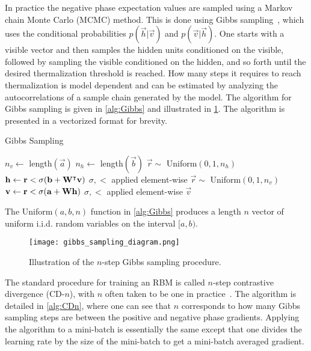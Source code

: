 In practice the negative phase expectation values are sampled using a Markov chain Monte Carlo (MCMC) method.
This is done using Gibbs sampling~\cite{hinton_rbm_training}, which uses the conditional probabilities \( p(\vec{h}|\vec{v}) \) and \( p(\vec{v}|\vec{h}) \).
One starts with a visible vector and then samples the hidden units conditioned on the visible, followed by sampling the visible conditioned on the hidden, and so forth until the desired thermalization threshold is reached.
How many steps it requires to reach thermalization is model dependent and can be estimated by analyzing the autocorrelations of a sample chain generated by the model.
The algorithm for Gibbs sampling is given in \cref{alg:Gibbs} and illustrated in \cref{fig:gibbs_sampling_diagram}.
The algorithm is presented in a vectorized format for brevity.

\begin{algorithm}
\caption{Gibbs Sampling}
\begin{algorithmic}[1]
        \State $n_v \gets$ length$(\vec{a})$
        \State $n_h \gets$ length$(\vec{b})$
            \State $\vec{r} \sim$ Uniform$(0, 1, n_h)$
            \State $\mathbf{h} \gets \mathbf{r} < \sigma(\mathbf{b} + \mathbf{W}^\intercal\mathbf{v})$
                \Comment $\sigma, <$ applied element-wise
            \State $\vec{r} \sim$ Uniform$(0, 1, n_v)$
            \State $\mathbf{v} \gets \mathbf{r} < \sigma(\mathbf{a} + \mathbf{W}\mathbf{h})$
                \Comment $\sigma, <$ applied element-wise
        \EndFor
        \State \Return $\vec{v}$
    \EndProcedure
\end{algorithmic}
\label{alg:Gibbs}
\end{algorithm}
The Uniform$(a, b, n)$ function in \cref{alg:Gibbs} produces a length \( n \) vector of uniform i.i.d. random variables on the interval $[a, b)$.

\begin{figure}
    \begin{center}
        \texttt{[image: gibbs\_sampling\_diagram.png]}
    \end{center}
    \caption{Illustration of the \( n \)-step Gibbs sampling procedure.}
    \label{fig:gibbs_sampling_diagram}
\end{figure}

The standard procedure for training an RBM is called \( n \)-step contrastive divergence (CD-\( n \)), with \( n \) often taken to be one in practice~\cite{hinton_rbm_training}.
The algorithm is detailed in \cref{alg:CDn}, where one can see that \( n \) corresponds to how many Gibbs sampling steps are between the positive and negative phase gradients.
Applying the algorithm to a mini-batch is essentially the same except that one divides the learning rate by the size of the mini-batch to get a mini-batch averaged gradient.

